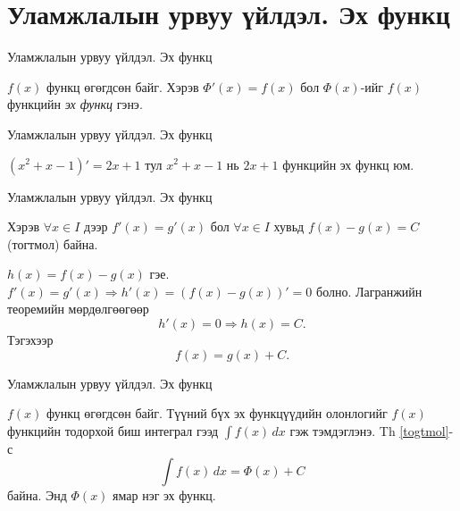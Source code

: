 

\section{Уламжлалын урвуу үйлдэл. Эх функц}
\begin{frame}[allowframebreaks]{Уламжлалын урвуу үйлдэл. Эх функц}
\begin{definition}
 $f(x)$ функц өгөгдсөн байг. Хэрэв $\Phi'(x)=f(x)$ бол $\Phi(x)$-ийг $f(x)$ функцийн
\emph{эх функц} гэнэ.   
\end{definition}
\end{frame}

\begin{frame}[allowframebreaks]{Уламжлалын урвуу үйлдэл. Эх функц}
\begin{example}
    $(x^2+x-1)'=2x+1$ тул $x^2+x-1$ нь $2x+1$ функцийн эх функц юм.
\end{example}
\end{frame}

\begin{frame}[allowframebreaks]{Уламжлалын урвуу үйлдэл. Эх функц}
\begin{theorem}\label{togtmol}
   Хэрэв $\forall x\in I$ дээр $f'(x)=g'(x)$ бол $\forall x\in I$ хувьд $f(x)-g(x)=C$ (тогтмол) байна.
 \end{theorem} 
\begin{prof} $h(x)=f(x)-g(x)$ гэе. 
$f'(x)=g'(x) \Rightarrow h'(x)=(f(x)-g(x))'=0$ болно. Лагранжийн теоремийн мөрдөлгөөгөөр   
 $$h'(x)=0 \Rightarrow h(x)=C.$$ Тэгэхээр
\[
f(x)=g(x)+C.
\]
\end{prof}
\end{frame}

\begin{frame}[allowframebreaks]{Уламжлалын урвуу үйлдэл. Эх функц}
\begin{definition}
 $f(x)$ функц өгөгдсөн байг. Түүний бүх эх функцүүдийн олонлогийг  $f(x)$ функцийн тодорхой биш интеграл гээд 
 $\displaystyle\int f(x)\,dx$ гэж тэмдэглэнэ. Th \ref{togtmol}-с 
 $$\int f(x)\,dx=\Phi(x)+C$$ байна. Энд $\Phi(x)$  ямар нэг эх функц.
 \end{definition}
\end{frame}

